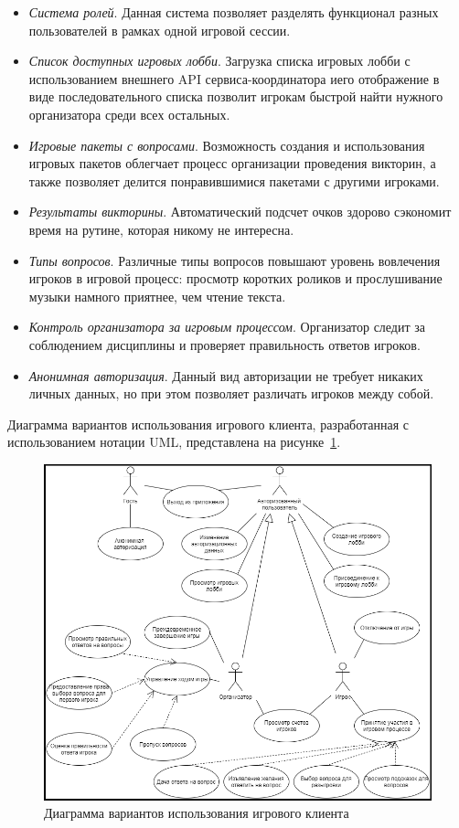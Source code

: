 \begin{itemize}
	\item \emph{Система ролей}. Данная система позволяет разделять функционал разных пользователей в рамках одной игровой сессии.
	\item \emph{Список доступных игровых лобби}. Загрузка списка игровых лобби с использованием внешнего API сервиса-координатора иего отображение в виде последовательного списка позволит игрокам быстрой найти нужного организатора среди всех остальных.
	\item \emph{Игровые пакеты с вопросами}. Возможность создания и использования игровых пакетов облегчает процесс организации проведения викторин, а также позволяет делится понравившимися пакетами с другими игроками.
	\item \emph{Результаты викторины}. Автоматический подсчет очков здорово сэкономит время на рутине, которая никому не интересна.
	\item \emph{Типы вопросов}. Различные типы вопросов повышают уровень вовлечения игроков в игровой процесс: просмотр коротких роликов и прослушивание музыки намного приятнее, чем чтение текста.
	\item \emph{Контроль организатора за игровым процессом}. Организатор следит за соблюдением дисциплины и проверяет правильность ответов игроков.
	\item \emph{Анонимная авторизация}. Данный вид авторизации не требует никаких личных данных, но при этом позволяет различать игроков между собой.
\end{itemize}

Диаграмма вариантов использования игрового клиента, разработанная с использованием нотации UML, представлена на рисунке~\ref{fig:domain:model:use_cases:model_game}.

\begin{figure}[ht]
\centering
	\includegraphics[scale=0.75]{attachments/use_case_model_game.png}
	\caption{Диаграмма вариантов использования игрового клиента}
	\label{fig:domain:model:use_cases:model_game}
\end{figure}

